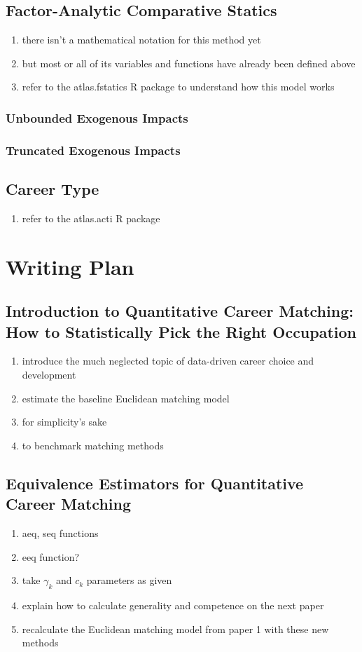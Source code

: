 \documentclass{elsarticle} %
\begin{document}
\subsection{Factor-Analytic Comparative Statics}
\begin{enumerate}
    \item there isn't a mathematical notation for this method yet
    \item but most or all of its variables and functions have already been defined above
    \item refer to the atlas.fstatics R package to understand how this model works
\end{enumerate}
\subsubsection{Unbounded Exogenous Impacts}
\subsubsection{Truncated Exogenous Impacts}
\subsection{Career Type}
\begin{enumerate}
    \item refer to the atlas.acti R package
\end{enumerate}

\section{Writing Plan}
\subsection{Introduction to Quantitative Career Matching: How to Statistically Pick the Right Occupation}
\begin{enumerate}
    \item introduce the much neglected topic of data-driven career choice and development
    \item estimate the baseline Euclidean matching model
    \item for simplicity's sake
    \item to benchmark matching methods
\end{enumerate}

\subsection{Equivalence Estimators for Quantitative Career Matching}
\begin{enumerate}
    \item aeq, seq functions
    \item eeq function?
    \item take $\gamma_k$ and $c_k$ parameters as given
    \item explain how to calculate generality and competence on the next paper
    \item recalculate the Euclidean matching model from paper 1 with these new methods
\end{enumerate}
\end{document}
